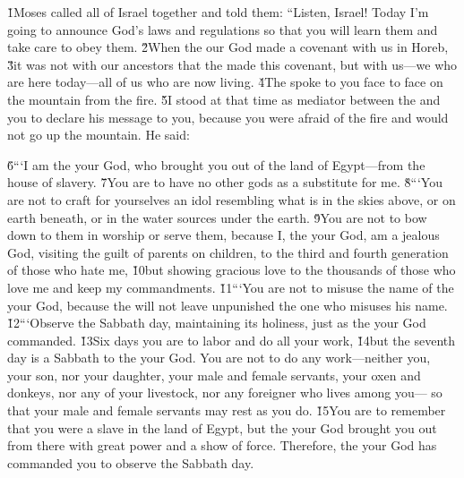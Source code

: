 \v{1}Moses called all of Israel together and told them: ``Listen, Israel! Today I'm going to announce God's laws and regulations so that you will learn them and take care to obey them. \v{2}When the  our God made a covenant with us in Horeb, \v{3}it was not with our ancestors that the  made this covenant, but with us---we who are here today---all of us who are now living. \v{4}The  spoke to you face to face on the mountain from the fire. \v{5}I stood at that time as mediator between the  and you to declare his message to you, because you were afraid of the fire and would not go up the mountain. He said:
\begin{bulletlist}
 \v{6}```I am the  your God, who brought you out of the land of Egypt---from the house of slavery. \v{7}You are to have no other gods as a substitute for me.
 \v{8}```You are not to craft for yourselves an idol resembling what is in the skies above, or on earth beneath, or in the water sources under the earth. \v{9}You are not to bow down to them in worship or serve them, because I, the  your God, am a jealous God, visiting the guilt of parents on children, to the third and fourth generation of those who hate me, \v{10}but showing gracious love to the thousands of those who love me and keep my commandments.
 \v{11}```You are not to misuse the name of the  your God, because the  will not leave unpunished the one who misuses his name.
 \v{12}```Observe the Sabbath day, maintaining its holiness, just as the  your God commanded. \v{13}Six days you are to labor and do all your work, \v{14}but the seventh day is a Sabbath to the  your God. You are not to do any work---neither you, your son, nor your daughter, your male and female servants, your oxen and donkeys, nor any of your livestock, nor any foreigner who lives among you--- so that your male and female servants may rest as you do. \v{15}You are to remember that you were a slave in the land of Egypt, but the  your God brought you out from there with great power and a show of force. Therefore, the  your God has commanded you to observe the Sabbath day.

\end{bulletlist}
